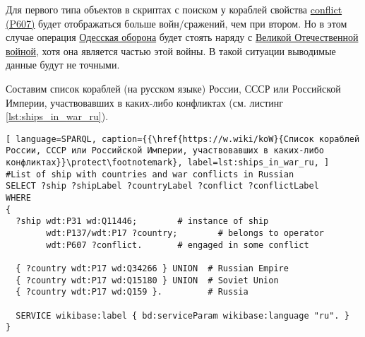 Для первого типа объектов в скриптах с поиском у кораблей свойства \href{https://www.wikidata.org/wiki/Property:P607}{conflict (P607)} будет отображаться больше войн/сражений, чем при втором. Но в этом случае операция \href{https://ru.wikipedia.org/wiki/Одесская_оборона_(1941)}{Одесская оборона} будет стоять наряду с \href{https://ru.wikipedia.org/wiki/Великая_Отечественная_война}{Великой Отечественной войной}, хотя она является частью этой войны. В такой ситуации выводимые данные будут не точными.

\label{question:ship_2}

\label{question:ship_3}

Составим список кораблей (на русском языке) России, СССР или Российской Империи, участвовавших в каких-либо конфликтах (см. листинг \ref{lst:ships_in_war_ru}).

\begin{lstlisting}[ language=SPARQL, caption={{\href{https://w.wiki/koW}{Список кораблей России, СССР или Российской Империи, участвовавших в каких-либо конфликтах}}\protect\footnotemark}, label=lst:ships_in_war_ru, ]
#List of ship with countries and war conflicts in Russian
SELECT ?ship ?shipLabel ?countryLabel ?conflict ?conflictLabel
WHERE
{
  ?ship wdt:P31 wd:Q11446;        # instance of ship
        wdt:P137/wdt:P17 ?country;        # belongs to operator
        wdt:P607 ?conflict.       # engaged in some conflict
  
  { ?country wdt:P17 wd:Q34266 } UNION  # Russian Empire
  { ?country wdt:P17 wd:Q15180 } UNION  # Soviet Union
  { ?country wdt:P17 wd:Q159 }.         # Russia

  SERVICE wikibase:label { bd:serviceParam wikibase:language "ru". }
}
\end{lstlisting}
  

